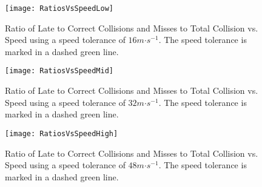 \begin{figure}
	\centering
	\texttt{[image: RatiosVsSpeedLow]}
	\caption{Ratio of Late to Correct Collisions and Misses to Total Collision vs. Speed using a speed tolerance of $16m\mathord{\cdot}s^{-1}$. The speed tolerance is marked in a dashed green line.}
	\label{fig_RatioVsSpeedLow}
\end{figure}
\begin{figure}
	\centering
	\texttt{[image: RatiosVsSpeedMid]}
	\caption{Ratio of Late to Correct Collisions and Misses to Total Collision vs. Speed using a speed tolerance of $32m\mathord{\cdot}s^{-1}$. The speed tolerance is marked in a dashed green line.}
	\label{fig_RatioVsSpeedMid}
\end{figure}
\begin{figure}
	\centering
	\texttt{[image: RatiosVsSpeedHigh]}
	\caption{Ratio of Late to Correct Collisions and Misses to Total Collision vs. Speed using a speed tolerance of $48m\mathord{\cdot}s^{-1}$. The speed tolerance is marked in a dashed green line.}
	\label{fig_RatioVsSpeedHigh}
\end{figure}

